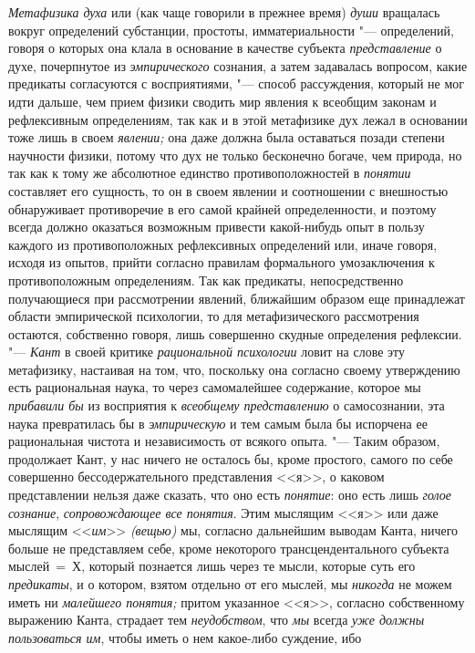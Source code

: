 {\em Метафизика духа} или (как чаще говорили в прежнее время)
{\em души} вращалась
вокруг определений субстанции, простоты, имматериальности
"--- определений, говоря о которых она клала в основание в
качестве субъекта {\em представление}
о духе, почерпнутое из {\em эмпирического}
сознания, а затем задавалась вопросом, какие предикаты
согласуются с восприятиями, "--- способ рассуждения, который не
мог идти дальше, чем прием физики сводить мир явления к всеобщим законам и
рефлексивным определениям, так как и в этой метафизике дух лежал в
основании тоже лишь в своем {\em явлении;} она даже
должна была оставаться позади степени научности физики,
потому что дух не только бесконечно богаче, чем природа, но
так как к тому же абсолютное единство противоположностей в
{\em понятии} составляет
его сущность, то он в своем явлении и соотношении с внешностью обнаруживает
противоречие в его самой крайней определенности, и поэтому всегда должно
оказаться возможным привести какой-нибудь опыт в пользу каждого из
противоположных рефлексивных определений или, иначе говоря, исходя из
опытов, прийти согласно правилам формального умозаключения к
противоположным определениям. Так как предикаты, непосредственно
получающиеся при рассмотрении явлений, ближайшим образом еще принадлежат
области эмпирической психологии, то для метафизического рассмотрения
остаются, собственно говоря, лишь совершенно скудные определения
рефлексии. "--- {\em Кант} в
своей критике {\em рациональной
психологии} ловит на слове эту метафизику, настаивая на том,
что, поскольку она согласно своему утверждению есть рациональная наука, то
через самомалейшее содержание, которое мы
{\em прибавили бы} из
восприятия к {\em всеобщему
представлению} о самосознании, эта наука превратилась бы в
{\em эмпирическую} и тем
самым была бы испорчена ее рациональная чистота и независимость от всякого
опыта. "--- Таким образом, продолжает Кант, у нас ничего не
осталось бы, кроме простого, самого по себе совершенно бессодержательного
представления <<я>>, о каковом представлении нельзя даже сказать, что оно
есть {\em понятие}: оно есть лишь {\em голое сознание},
{\em сопровождающее все понятия}. Этим мыслящим <<я>> или даже мыслящим
<<{\em им}>> {\em (вещью)} мы, согласно
дальнейшим выводам Канта, ничего больше не представляем себе, кроме
некоторого трансцендентального субъекта мыслей~=~Х, который познается лишь
через те мысли, которые суть его {\em предикаты}, и о
котором, взятом отдельно от его мыслей, мы {\em никогда} не можем
иметь ни {\em малейшего понятия;}
притом указанное <<я>>, согласно собственному выражению Канта,
страдает тем {\em неудобством}, что {\em мы} всегда {\em уже должны
пользоваться им}, чтобы иметь о нем какое-либо суждение, ибо

